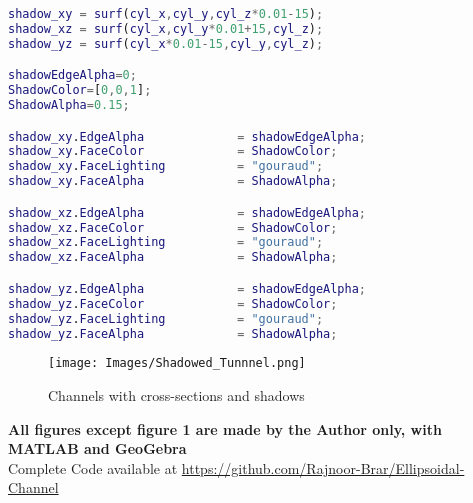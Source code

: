 \documentclass[a4paper]{article}
\begin{document}
\begin{lstlisting}[language=matlab]
shadow_xy = surf(cyl_x,cyl_y,cyl_z*0.01-15);
shadow_xz = surf(cyl_x,cyl_y*0.01+15,cyl_z);
shadow_yz = surf(cyl_x*0.01-15,cyl_y,cyl_z);

shadowEdgeAlpha=0;
ShadowColor=[0,0,1];
ShadowAlpha=0.15;

shadow_xy.EdgeAlpha             = shadowEdgeAlpha;
shadow_xy.FaceColor             = ShadowColor;
shadow_xy.FaceLighting          = "gouraud";
shadow_xy.FaceAlpha             = ShadowAlpha;

shadow_xz.EdgeAlpha             = shadowEdgeAlpha;
shadow_xz.FaceColor             = ShadowColor;
shadow_xz.FaceLighting          = "gouraud";
shadow_xz.FaceAlpha             = ShadowAlpha;

shadow_yz.EdgeAlpha             = shadowEdgeAlpha;
shadow_yz.FaceColor             = ShadowColor;
shadow_yz.FaceLighting          = "gouraud";
shadow_yz.FaceAlpha             = ShadowAlpha;
\end{lstlisting}
\newpage
\begin{figure}[h]
    \centering
    \texttt{[image: Images/Shadowed\_Tunnnel.png]}
    \caption{Channels with cross-sections and shadows}
\end{figure}

\newpage



\textbf{All figures except figure 1 are made by the Author only, with MATLAB and GeoGebra}\\
Complete Code available at \url{https://github.com/Rajnoor-Brar/Ellipsoidal-Channel}
\end{document}
